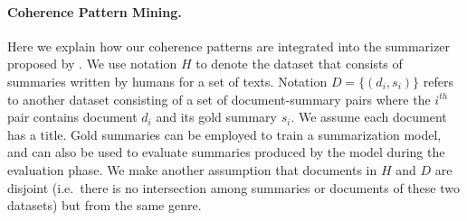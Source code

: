 
\paragraph{Coherence Pattern Mining.}
Here we explain how our coherence patterns are integrated into the summarizer proposed by . 
We use notation $H$ to denote the dataset that consists of summaries written by humans for a set of texts.  
Notation $D=\lbrace \left( d_i, s_i \right) \rbrace$ refers to another dataset consisting of a set of document-summary pairs where the $i^{th}$ pair contains document $d_i$ and  its gold summary $s_i$.  
We assume each document has a title. 
Gold summaries can be employed to train a summarization model, and can also be used to evaluate summaries produced by the model during the evaluation phase. 
We make another assumption that documents in $H$ and $D$ are disjoint (i.e.\ there is no intersection among summaries or documents of these two datasets) but from the same genre. 


